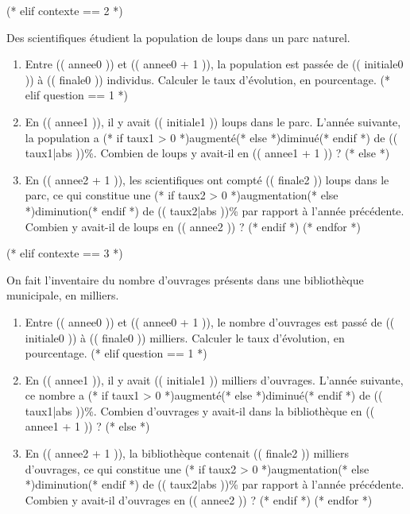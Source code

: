 (* elif contexte == 2 *)

    Des scientifiques étudient la population de loups dans un parc naturel.

    \begin{enumerate}
      (* for question in ordre *)
        (* if question == 0 *)
          \item
            Entre (( annee0 )) et (( annee0 + 1 )),
            la population est passée de (( initiale0 )) à (( finale0 )) individus.
            Calculer le taux d'évolution, en pourcentage.
        (* elif question == 1 *)
          \item
              En (( annee1 )), il y avait (( initiale1 )) loups dans le parc.
              L'année suivante, la population a (* if taux1 > 0 *)augmenté(* else *)diminué(* endif *) de (( taux1|abs ))\%.
              Combien de loups y avait-il en (( annee1 + 1 )) ?
        (* else *)
          \item
            En (( annee2 + 1 )), les scientifiques ont compté (( finale2 )) loups dans le parc,
            ce qui constitue une (* if taux2 > 0 *)augmentation(* else *)diminution(* endif *) de (( taux2|abs ))\% par rapport à l'année précédente.
            Combien y avait-il de loups en (( annee2 )) ?
        (* endif *)
      (* endfor *)
    \end{enumerate}

(* elif contexte == 3 *)

    On fait l'inventaire du nombre d'ouvrages présents dans une bibliothèque municipale, en milliers.

    \begin{enumerate}
      (* for question in ordre *)
        (* if question == 0 *)
          \item
            Entre (( annee0 )) et (( annee0 + 1 )),
            le nombre d'ouvrages est passé de (( initiale0 )) à (( finale0 )) milliers.
            Calculer le taux d'évolution, en pourcentage.
        (* elif question == 1 *)
          \item
              En (( annee1 )), il y avait (( initiale1 )) milliers d'ouvrages.
              L'année suivante, ce nombre a (* if taux1 > 0 *)augmenté(* else *)diminué(* endif *) de (( taux1|abs ))\%.
              Combien d'ouvrages y avait-il dans la bibliothèque en (( annee1 + 1 )) ?
        (* else *)
          \item
            En (( annee2 + 1 )), la bibliothèque contenait (( finale2 )) milliers d'ouvrages,
            ce qui constitue une (* if taux2 > 0 *)augmentation(* else *)diminution(* endif *) de (( taux2|abs ))\% par rapport à l'année précédente.
            Combien y avait-il d'ouvrages en (( annee2 )) ?
        (* endif *)
      (* endfor *)
    \end{enumerate}

